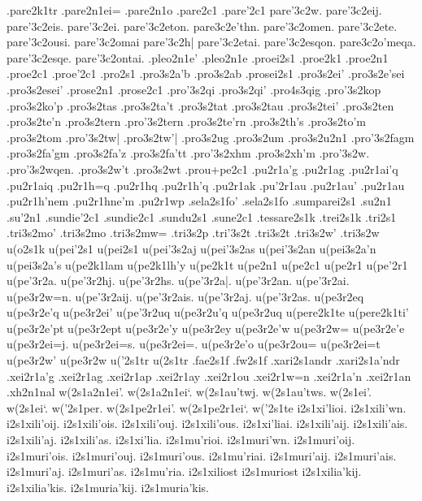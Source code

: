 {.pare2k1tr
.pare2n1ei=
.pare2n1o
.pare2c1
.pare'2c1
pare'3c2w.
pare'3c2eij.
pare'3c2eis.
pare'3c2ei.
pare'3c2eton.
pare3c2e'thn.
pare'3c2omen.
pare'3c2ete.
pare'3c2ousi.
pare'3c2omai
pare'3c2h|
pare'3c2etai.
pare'3c2esqon.
pare3c2o'meqa.
pare'3c2esqe.
pare'3c2ontai.
.pleo2n1e'
.pleo2n1e
.proei2s1
.proe2k1
.proe2n1
.proe2c1
.proe'2c1
.pro2s1
.pro3s2a'b
.pro3s2ab
.prosei2s1
.pro3s2ei'
.pro3s2e'sei
.pro3s2esei'
.prose2n1
.prose2c1
.pro'3s2qi
.pro3s2qi'
.pro4s3qig
.pro'3s2kop
.pro3s2ko'p
.pro3s2tas
.pro3s2ta't
.pro3s2tat
.pro3s2tau
.pro3s2tei'
.pro3s2ten
.pro3s2te'n
.pro3s2tern
.pro'3s2tern
.pro3s2te'rn
.pro3s2th's
.pro3s2to'm
.pro3s2tom
.pro'3s2tw|
.pro3s2tw'|
.pro3s2ug
.pro3s2um
.pro3s2u2n1
.pro'3s2fagm
.pro3s2fa'gm
.pro3s2fa'z
.pro3s2fa'tt
.pro'3s2xhm
.pro3s2xh'm
.pro'3s2w.
.pro'3s2wqen.
.pro3s2w't
.pro3s2wt
.prou+pe2c1
.pu2r1a'g
.pu2r1ag
.pu2r1ai'q
.pu2r1aiq
.pu2r1h=q
.pu2r1hq
.pu2r1h'q
.pu2r1ak
.pu'2r1au
.pu2r1au'
.pu2r1au
.pu2r1h'nem
.pu2r1hne'm
.pu2r1wp
.sela2s1fo'
.sela2s1fo
.sumparei2s1
.su2n1
.su'2n1
.sundie'2c1
.sundie2c1
.sundu2s1
.sune2c1
.tessare2s1k
.trei2s1k
.tri2s1
.tri3s2mo'
.tri3s2mo
.tri3s2mw=
.tri3s2p
.tri'3s2t
.tri3s2t
.tri3s2w'
.tri3s2w
u(o2s1k
u(pei'2s1
u(pei2s1
u(pei'3s2aj
u(pei'3s2as
u(pei'3s2an
u(pei3s2a'n
u(pei3s2a's
u(pe2k1lam
u(pe2k1lh'y
u(pe2k1t
u(pe2n1
u(pe2c1
u(pe2r1
u(pe'2r1
u(pe'3r2a.
u(pe'3r2hj.
u(pe'3r2hs.
u(pe'3r2a|.
u(pe'3r2an.
u(pe'3r2ai.
u(pe3r2w=n.
u(pe'3r2aij.
u(pe'3r2ais.
u(pe'3r2aj.
u(pe'3r2as.
u(pe3r2eq
u(pe3r2e'q
u(pe3r2ei'
u(pe'3r2uq
u(pe3r2u'q
u(pe3r2uq
u(pere2k1te
u(pere2k1ti'
u(pe3r2e'pt
u(pe3r2ept
u(pe3r2e'y
u(pe3r2ey
u(pe3r2e'w
u(pe3r2w=
u(pe3r2e'e
u(pe3r2ei=j.
u(pe3r2ei=s.
u(pe3r2ei=.
u(pe3r2e'o
u(pe3r2ou=
u(pe3r2ei=t
u(pe3r2w'
u(pe3r2w
u('2s1tr
u(2s1tr
.fae2s1f
.fw2s1f
.xari2s1andr
.xari2s1a'ndr
.xei2r1a'g
.xei2r1ag
.xei2r1ap
.xei2r1ay
.xei2r1ou
.xei2r1w=n
.xei2r1a'n
.xei2r1an
.xh2n1nal
w(2s1a2n1ei'.
w(2s1a2n1ei`.
w(2s1au'twj.
w(2s1au'tws.
w(2s1ei'.
w(2s1ei`.
w('2s1per.
w(2s1pe2r1ei'.
w(2s1pe2r1ei`.
w('2s1te
i2s1xi'lioi.
i2s1xili'wn.
i2s1xili'oij.
i2s1xili'ois.
i2s1xili'ouj.
i2s1xili'ous.
i2s1xi'liai.
i2s1xili'aij.
i2s1xili'ais.
i2s1xili'aj.
i2s1xili'as.
i2s1xi'lia.
%
i2s1mu'rioi.
i2s1muri'wn.
i2s1muri'oij.
i2s1muri'ois.
i2s1muri'ouj.
i2s1muri'ous.
i2s1mu'riai.
i2s1muri'aij.
i2s1muri'ais.
i2s1muri'aj.
i2s1muri'as.
i2s1mu'ria.
%
i2s1xiliost
%
i2s1muriost
%
i2s1xilia'kij.
i2s1xilia'kis.
%
i2s1muria'kij.
i2s1muria'kis.
}
\endgroup
\endinput
